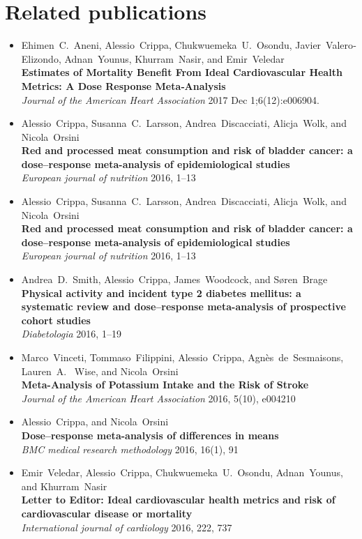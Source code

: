 \chapter*{Related publications}
\begin{itemize}
\item Ehimen~C.~Aneni, Alessio~Crippa, Chukwuemeka~U.~Osondu, Javier~Valero‐Elizondo, Adnan~Younus, Khurram~Nasir, and Emir~Veledar \\ \textbf{Estimates of Mortality Benefit From Ideal Cardiovascular Health Metrics: A Dose Response Meta‐Analysis} \\ \textit{Journal of the American Heart Association} 2017 Dec 1;6(12):e006904.
\item Alessio~Crippa, Susanna~C.~Larsson, Andrea~Discacciati, Alicja~Wolk, and Nicola~Orsini \\ \textbf{Red and processed meat consumption and risk of bladder cancer: a dose--response meta-analysis of epidemiological studies} \\ \textit{European journal of nutrition} 2016, 1--13
\item Alessio~Crippa, Susanna~C.~Larsson, Andrea~Discacciati, Alicja~Wolk, and Nicola~Orsini \\ \textbf{Red and processed meat consumption and risk of bladder cancer: a dose--response meta-analysis of epidemiological studies} \\ \textit{European journal of nutrition} 2016, 1--13
\item Andrea~D.~Smith, Alessio~Crippa, James~Woodcock, and S{\o}ren~Brage \\ \textbf{Physical activity and incident type 2 diabetes mellitus: a systematic review and dose--response meta-analysis of prospective cohort studies} \\ \textit{Diabetologia} 2016, 1--19
\item Marco~Vinceti, Tommaso~Filippini, Alessio~Crippa, Agn{\`e}s~de~Sesmaisons, Lauren~A.~ Wise, and Nicola~Orsini \\ \textbf{Meta-Analysis of Potassium Intake and the Risk of Stroke} \\ \textit{Journal of the American Heart Association} 2016, 5(10), e004210
\item Alessio~Crippa, and Nicola~Orsini \\ \textbf{Dose--response meta-analysis of differences in means} \\ \textit{BMC medical research methodology} 2016, 16(1), 91
\item Emir~Veledar, Alessio~Crippa, Chukwuemeka~U.~Osondu, Adnan~Younus, and Khurram~Nasir \\ \textbf{Letter to Editor: Ideal cardiovascular health metrics and risk of cardiovascular disease or mortality} \\ \textit{International journal of cardiology} 2016, 222, 737

\end{itemize}
